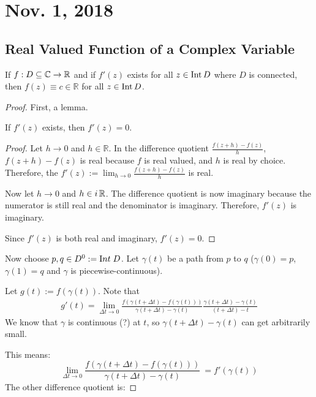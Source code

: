 \section{Nov. 1, 2018}
\subsection{Real Valued Function of a Complex Variable}

\begin{theorem}
    If $f:D \subseteq \operatorname{\mathbb{C}} \to \operatorname{\mathbb{R}}$ and if $f'(z)$ exists for all $z \in \operatorname{Int}{D}$ where $D$ is connected, then $f(z) \equiv c \in \mathbb{R}$ for all $z \in \operatorname{Int}{D}$.
\end{theorem}

\begin{proof}
First, a lemma.
    \begin{lemma}
        If $f'(z)$ exists, then $f'(z) = 0$.
    \end{lemma}

    \begin{proof}
        Let $h \to 0$ and $h \in \mathbb{R}$.
        In the difference quotient $\frac{f(z+h)-f(z)}{h}$, 
        $f(z+h) - f(z)$ is real because $f$ is real valued, 
        and $h$ is real by choice.
        Therefore, the $f'(z) := \lim_{h \to 0} \frac{f(z+h) - f(z)}{h}$ is real.

        Now let $h \to 0$ and $h \in i\operatorname{\mathbb{R}}$.  
        The difference quotient is now imaginary because the numerator is still real and the denominator is imaginary.
        Therefore, $f'(z)$ is imaginary.

        Since $f'(z)$ is both real and imaginary, $f'(z) = 0$.
    \end{proof}

    Now choose $p,q \in D^0 := {\text Int}\; D$.
    Let $\gamma(t)$ be a path from $p$ to $q$ ($\gamma(0) = p$, $\gamma(1) =q$ and $\gamma$ is piecewise-continuous).
    
    Let $g(t) := f(\gamma(t))$.
    Note that
    \begin{align*}
        g'(t) = \lim_{\Delta t \to 0} \frac{f(\gamma(t+\Delta t) - f(\gamma(t)))}{\gamma(t + \Delta t) - \gamma(t)}\frac{\gamma(t + \Delta t) - \gamma(t)}{(t + \Delta t) - t} 
    \end{align*}
    We know that $\gamma$ is continuous (?) at $t$, so $\gamma(t+\Delta t) - \gamma(t)$ can get arbitrarily small.

    This means:
    \[\lim_{\Delta t \to 0} \frac{f(\gamma(t+\Delta t) - f(\gamma(t)))}{\gamma(t + \Delta t) - \gamma(t)}\ = f'(\gamma(t)) \]
    The other difference quotient is:


\end{proof}
